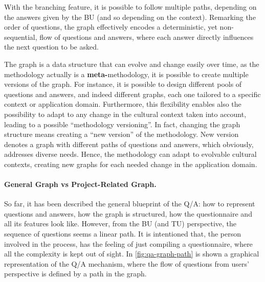 \documentclass[12pt,a4paper,openright,twoside]{book}
\begin{document}
With the branching feature, it is possible to follow multiple paths, depending on the answers given by the \ac{BU} (and so depending on the context).
%
Remarking the order of questions, the graph effectively encodes a deterministic, yet non-sequential, flow of questions and answers, where each answer directly influences the next question to be asked.

The graph is a data structure that can evolve and change easily over time, as the methodology actually is a \textbf{meta-}methodology, it is possible to create multiple versions of the graph.
%
For instance, it is possible to design different pools of questions and answers, and indeed different graphs, each one tailored to a specific context or application domain.
%
Furthermore, this flexibility enables also the possibility to adapt to any change in the cultural context taken into account, leading to a possible ``methodology versioning''.
%
In fact, changing the graph structure means creating a ``new version'' of the methodology.
%
New version denotes a graph with different paths of questions and answers, which obviously, addresses diverse needs.
%
Hence, the methodology can adapt to evolvable cultural contexts, creating new graphs for each needed change in the application domain.

\paragraph{General Graph vs Project-Related Graph.}
So far, it has been described the general blueprint of the \ac{Q/A}: how to represent questions and answers, how the graph is structured, how the questionnaire and all its features look like.
%
However, from the \acl{BU} (and \acl{TU}) perspective, the sequence of questions seems a linear path.
%
It is intentioned that, the person involved in the process, has the feeling of just compiling a questionnaire, where all the complexity is kept out of sight.
%
In \cref{fig:qa-graph-path} is shown a graphical representation of the \ac{Q/A} mechanism, where the flow of questions from users' perspective is defined by a path in the graph.
\end{document}
